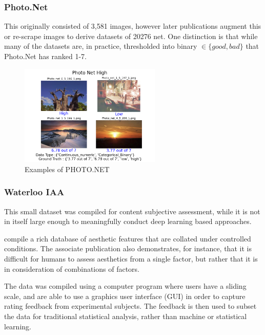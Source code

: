 \subsubsection{Photo.Net}


This originally consisted of 3,581\cite{Datta2006}  images, however later publications \cite{Joshi2011} augment this or re-scrape images to derive datasets of 20276  net. One distinction is that while many of the datasets are, in practice, thresholded into binary $\in \{good,bad\}$ that Photo.Net has ranked 1-7.

\begin{figure}[hp]
\centering
 \includegraphics[width=0.6\textwidth]{figures/database_ims/Photo Net High.png}
  \caption{\label{fig:Pnet} Examples of PHOTO.NET}
  \label{fig:Pnet_}

\end{figure}





\subsubsection{Waterloo IAA}


This small dataset was compiled for content subjective assessment, while it is not in itself large enough to meaningfully conduct deep learning based approaches. 

\cite{Liu2017} compile a rich database of aesthetic features that are collated under controlled conditions. The associate publication also demonstrates, for instance, that it is difficult for humans to assess aesthetics from a single factor, but rather that it is in consideration of combinations of factors. 

The data was compiled using a computer program where users have a sliding scale, and are able to use a graphics user interface (GUI) in order to capture rating feedback from experimental subjects. The feedback is then used to subset the data for traditional statistical analysis, rather than machine or statistical learning. 

